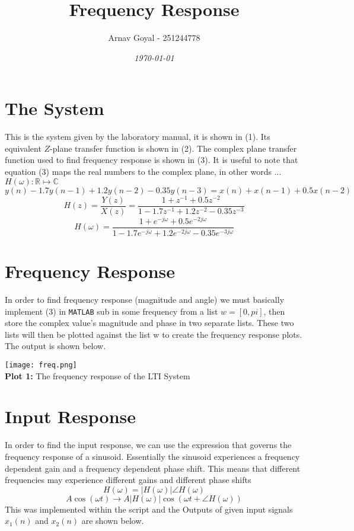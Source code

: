 \documentclass[]{report}
\title{\textbf{Frequency Response}}
\date{\textit{\today}}
\author{Arnav Goyal - 251244778}
\newcommand{\matlab}{\texttt{MATLAB} }
\begin{document}
\maketitle

\section*{The System}
This is the system given by the laboratory manual, it is shown in (1). Its equivalent $Z$-plane transfer function is shown in (2). The complex plane transfer function used to find frequency response is shown in (3). It is useful to note that equation (3) maps the real numbers to the complex plane, in other words $\ldots$ $H(\omega): \mathbb{R}\mapsto\mathbb{C}$
\begin{equation}
	y(n) - 1.7y(n-1) + 1.2y(n-2) -0.35y(n-3) = x(n) + x(n-1) + 0.5x(n-2)
\end{equation}
\begin{equation}
	H(z) = \frac{Y(z)}{X(z)} = \frac{1 + z^{-1} + 0.5z^{-2}}{1 - 1.7z^{-1} + 1.2z^{-2} -0.35z^{-3}}
\end{equation}
\begin{equation}
	H(\omega) = \frac{1 + e^{-j\omega} + 0.5e^{-2j\omega}}{1 - 1.7e^{-j\omega} +1.2e^{-2j\omega} -0.35e^{-3j\omega}}
\end{equation}

\section*{Frequency Response}
In order to find frequency response (magnitude and angle) we must basically implement (3) in \matlab sub in some frequency from a list $w=[0,pi]$, then store the complex value's magnitude and phase in two separate lists. These two lists will then be plotted against the list w to create the frequency response plots. The output is shown below.

\begin{center}
	\texttt{[image: freq.png]} \\ \vspace{1em}
	\textbf{Plot 1:} The frequency response of the LTI System
\end{center}

\section*{Input Response}
In order to find the input response, we can use the expression that governs the frequency response of a sinusoid. Essentially the sinusoid experiences a frequency dependent gain and a frequency dependent phase shift. This means that different frequencies may experience different gains and different phase shifts
	\[ H(\omega) = \left|H(\omega)\right|\angle H(\omega)	\]
	\[ A\cos{(\omega t)} \rightarrow A\left|H(\omega)\right|\cos{(\omega t + \angle H(\omega))} \]
This was implemented within the script and the Outputs of given input signals $x_1(n)$ and $x_2(n)$ are shown below. 
\end{document}
